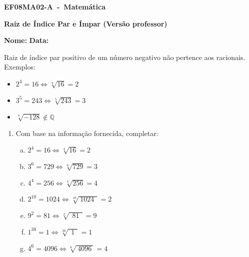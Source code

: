 \documentclass[a4paper,14pt]{article}
\begin{document}
	
	\noindent\textbf{EF08MA02-A~-~Matemática} 
	
	\begin{center}
		\textbf{Raiz de Índice Par e Ímpar (Versão professor)}
	\end{center}
	
	\bigskip
	
	\noindent\textbf{Nome:} \underline{\hspace{10cm}}
    \noindent\textbf{Data:} \underline{\hspace{4cm}}
	
	\bigskip
	
	\begin{multicols}{2}
        \noindent Raiz de índice par positivo de um número negativo não pertence aos racionais. \\
        Exemplos:
    \begin{itemize}
    	\item $2^4 = 16 \Leftrightarrow \sqrt[4]{16} = 2$
    	\item $3^5 = 243 \Leftrightarrow \sqrt[5]{243} = 3$
    	\item $\sqrt[4]{-128} \notin \mathbb{Q}$
    \end{itemize}
	\begin{enumerate}
		
		\item Com base na informação fornecida, completar:
		\begin{enumerate}[a)]
			\item $2^4 = 16 \Leftrightarrow \sqrt[4]{16} = 2$
			\item $3^6 = 729 \Leftrightarrow \sqrt[6]{729} = 3$
			\item $4^4 = 256 \Leftrightarrow \sqrt[4]{256} = 4$
			\item $2^{10} = 1024 \Leftrightarrow \sqrt[10]{~1024~~} = 2$
			\item $9^2 = 81 \Leftrightarrow \sqrt[2]{~~81~~} = 9$
			\item $1^{38} = 1 \Leftrightarrow \sqrt[38]{~~1~~} = 1$
			\item $4^6 = 4096 \Leftrightarrow \sqrt[6]{~4096~} = 4$
	    \end{enumerate}
    

\end{enumerate}
\end{multicols}
\end{document}

